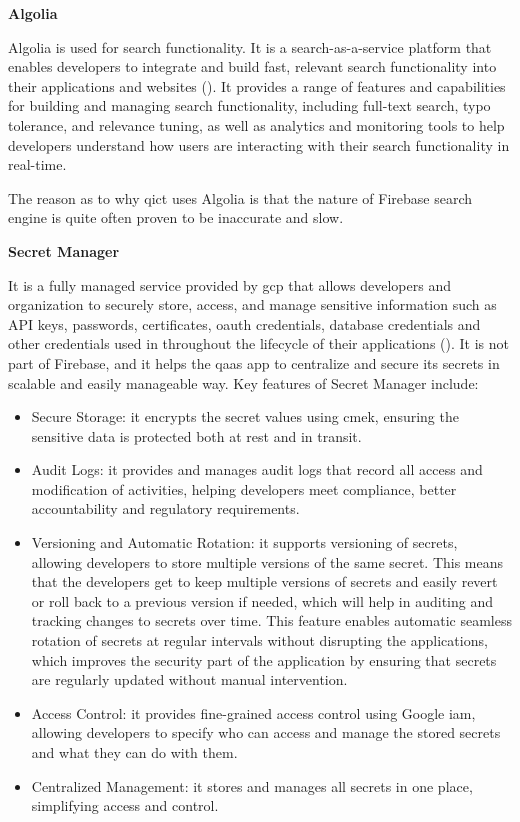 \begin{multicols}{2}
      \textbf{Algolia}

      Algolia is used for search functionality. It is a search-as-a-service platform that enables developers to
      integrate and build fast, relevant search functionality into their applications and websites (\cite{algolia}).
      It provides a range of features and capabilities for building and managing search functionality, including
      full-text search, typo tolerance, and relevance tuning, as well as analytics and monitoring tools to help
      developers understand how users are interacting with their search functionality in real-time.

      The reason as to why \acrshort{qict} uses Algolia is that the nature of Firebase search engine is quite often
      proven to be inaccurate and slow.

      \textbf{Secret Manager}

      It is a fully managed service provided by \acrshort{gcp} that allows developers and organization to securely store, 
      access, and manage sensitive information such as API keys, passwords, certificates, \acrshort{oauth} credentials, 
      database credentials and other credentials used in throughout the lifecycle of their applications 
      (\cite{googlesecretmanager}). It is not part of Firebase, and it helps the \acrshort{qaas} app to centralize and 
      secure its secrets in scalable and easily manageable way. Key features of Secret Manager include:
      \begin{itemize}
            \item Secure Storage: it encrypts the secret values using \acrshort{cmek}, ensuring the sensitive data is protected
                  both at rest and in transit.
            \item Audit Logs: it provides and manages audit logs that record all access and modification of activities, helping 
                  developers meet compliance, better accountability and regulatory requirements.
            \item Versioning and Automatic Rotation: it supports versioning of secrets, allowing developers to store multiple versions 
                  of the same secret. This means that the developers get to keep multiple versions of secrets and easily revert or roll 
                  back to a previous version if needed, which will help in auditing and tracking changes to secrets over time. This feature 
                  enables automatic seamless rotation of secrets at regular intervals without  disrupting the applications, which improves 
                  the security part of the application by ensuring that secrets are regularly updated without manual intervention. 
            \item Access Control: it provides fine-grained access control using Google \acrshort{iam}, allowing developers to specify 
                  who can access and manage the stored secrets and what they can do with them.
            \item Centralized Management: it stores and manages all secrets in one place, simplifying access and control. 
      \end{itemize}


\end{multicols}
